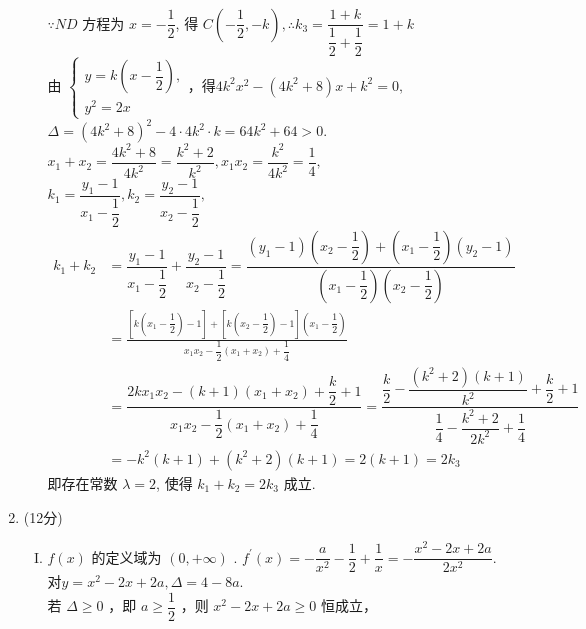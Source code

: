 \documentclass[11pt]{article}
\begin{document}
\begin{enumerate}
\begin{enumerate}[(I)]
		\\$\because N D$ 方程为 $x=-\dfrac{1}{2}$, 得 $C\left(-\dfrac{1}{2},-k\right), \therefore k_{3}=\dfrac{1+k}{\dfrac{1}{2}+\dfrac{1}{2}}=1+k$ 
		\\由 $\left\{\begin{array}{l}y=k\left(x-\dfrac{1}{2}\right), \\ y^{2}=2 x\end{array}\right.$，得$4 k^{2} x^{2}-\left(4 k^{2}+8\right) x+k^{2}=0,$
		\\$ \Delta=\left(4 k^{2}+8\right)^{2}-4 \cdot 4 k^{2} \cdot k=64 k^{2}+64>0 . $
		\\$x_{1}+x_{2}=\dfrac{4 k^{2}+8}{4 k^{2}}=\dfrac{k^{2}+2}{k^{2}}, x_{1} x_{2}=\dfrac{k^{2}}{4 k^{2}}=\dfrac{1}{4}, 
		$
		\\$ k_{1}=\dfrac{y_{1}-1}{x_{1}-\dfrac{1}{2}}, k_{2}=\dfrac{y_{2}-1}{x_{2}-\dfrac{1}{2}}, $
		\\
		\begin{align*}
			k_{1}+k_{2}&=\dfrac{y_{1}-1}{x_{1}-\dfrac{1}{2}}+\dfrac{y_{2}-1}{x_{2}-\dfrac{1}{2}}
			=\dfrac{\left(y_{1}-1\right)\left(x_{2}-\dfrac{1}{2}\right)+\left(x_{1}-\dfrac{1}{2}\right)\left(y_{2}-1\right)}{\left(x_{1}-\dfrac{1}{2}\right)\left(x_{2}-\dfrac{1}{2}\right)}
			\\
			&=\frac{\left[k\left(x_{1}-\dfrac{1}{2}\right)-1\right]+\left[k\left(x_{2}-\dfrac{1}{2}\right)-1\right]\left(x_{1}-\dfrac{1}{2}\right)}{x_{1} x_{2}-\dfrac{1}{2}\left(x_{1}+x_{2}\right)+\dfrac{1}{4}}
			\\ &=\dfrac{2 k x_{1} x_{2}-(k+1)\left(x_{1}+x_{2}\right)+\dfrac{k}{2}+1}{x_{1} x_{2}-\dfrac{1}{2}\left(x_{1}+x_{2}\right)+\dfrac{1}{4}}
			=\dfrac{\dfrac{k}{2}-\dfrac{(k^2+2)(k+1)}{k^2}+\dfrac{k}{2}+1   }{\dfrac{1}{4}-\dfrac{k^2+2}{2k^2}+\dfrac{1}{4}
			}
			\\ &=-k^2(k+1)+(k^2+2)(k+1)=2(k+1)=2k_3
		\end{align*}
		即存在常数 $\lambda=2$, 使得 $k_{1}+k_{2}=2 k_{3}$ 成立.
	\end{enumerate}
	\item (12分)
	\begin{enumerate}[(I)]
		\item $f(x)$ 的定义域为 $(0,+\infty)$ .
		$f^{\prime}(x)=-\dfrac{a}{x^{2}}-\dfrac{1}{2}+\dfrac{1}{x}=-\dfrac{x^{2}-2 x+2 a}{2 x^{2}} .$
		\\对$ y=x^2-2x+2a,\Delta =4-8a. $
		\\若 $\Delta \geq 0$ ，即 $a \geq \dfrac{1}{2}$ ，则 $x^{2}-2 x+2 a \geq 0$ 恒成立，

\end{enumerate}
\end{enumerate}
\end{document}
